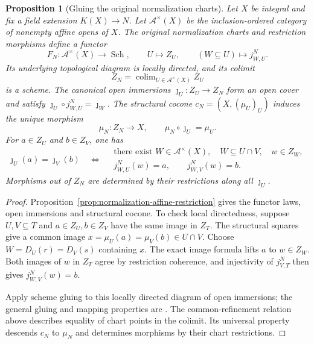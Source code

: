 \documentclass[11pt]{article}
\newtheorem{proposition}[theorem]{Proposition}
\theoremstyle{definition}
\theoremstyle{remark}
\begin{document}
\begin{proposition}[Gluing the original normalization charts]
\label{prop:normalization-gluing}
Let \(X\) be integral and fix a field extension \(K(X)\to N\).
Let \(\mathcal A^{\times}(X)\) be the inclusion-ordered category of
nonempty affine opens of \(X\). The original normalization charts and
restriction morphisms define a functor
\[
 F_N:\mathcal A^{\times}(X)\longrightarrow\operatorname{Sch},
 \qquad U\longmapsto Z_U,\qquad
 (W\subseteq U)\longmapsto j^N_{W,U}.
\]
Its underlying topological diagram is locally directed, and its colimit
\[
 Z_N=\mathop{\operatorname{colim}}_{U\in\mathcal A^{\times}(X)}Z_U
\]
is a scheme. The canonical open immersions
\(\jmath_U:Z_U\to Z_N\) form an open cover and satisfy
\(\jmath_U\circ j^N_{W,U}=\jmath_W\).
The structural cocone \(c_N=(X,(\mu_U)_U)\) induces the unique morphism
\[
 \mu_N:Z_N\longrightarrow X,
 \qquad \mu_N\circ\jmath_U=\mu_U.
\]
For \(a\in Z_U\) and \(b\in Z_V\), one has
\[
 \jmath_U(a)=\jmath_V(b)
 \quad\Longleftrightarrow\quad
 \begin{gathered}
  \text{there exist }W\in\mathcal A^{\times}(X),\quad W\subseteq U\cap V,
     \quad w\in Z_W,\\
  j^N_{W,U}(w)=a,\qquad j^N_{W,V}(w)=b.
 \end{gathered}
\]
Morphisms out of \(Z_N\) are determined by their restrictions along
all \(\jmath_U\).
\end{proposition}

\begin{proof}
Proposition~\ref{prop:normalization-affine-restriction} gives the functor
laws, open immersions and structural cocone. To check local directedness,
suppose \(U,V\subseteq T\) and \(a\in Z_U,b\in Z_V\) have the same
image in \(Z_T\). The structural squares give a common image
\(x=\mu_U(a)=\mu_V(b)\in U\cap V\).
Choose \(W=D_U(r)=D_V(s)\) containing \(x\). The exact image formula
lifts \(a\) to \(w\in Z_W\). Both images of \(w\) in \(Z_T\)
agree by restriction coherence, and injectivity of \(j^N_{V,T}\)
then gives \(j^N_{W,V}(w)=b\).

Apply scheme gluing to this locally directed diagram of open immersions;
the general gluing and mapping properties are
\cite{StacksGluingLocallyRingedSpaces,StacksGluingSchemes}.
The common-refinement relation above describes equality of chart points
in the colimit. Its universal property descends \(c_N\) to \(\mu_N\)
and determines morphisms by their chart restrictions.
\end{proof}
\end{document}
